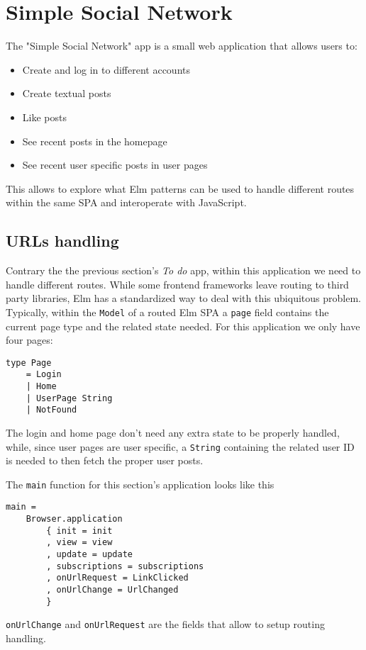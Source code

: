 \section{Simple Social Network}
The "Simple Social Network" app is a small web application that allows users to:
\begin{itemize}
    \item Create and log in to different accounts
    \item Create textual posts
    \item Like posts
    \item See recent posts in the homepage
    \item See recent user specific posts in user pages
\end{itemize}
This allows to explore what Elm patterns can be used to handle different routes within the same SPA and interoperate with JavaScript.

\subsection{URLs handling}
Contrary the the previous section's \textit{To do} app, within this application we need to handle different routes. While some frontend frameworks leave routing to third party libraries, Elm has a standardized way to deal with this ubiquitous problem.\\

Typically, within the \texttt{Model} of a routed Elm SPA a \texttt{page} field contains the current page type and the related state needed. For this application we only have four pages:
\begin{verbatim}
type Page
    = Login
    | Home
    | UserPage String
    | NotFound
\end{verbatim}
The login and home page don't need any extra state to be properly handled, while, since user pages are user specific, a \texttt{String} containing the related user ID is needed to then fetch the proper user posts.

The \texttt{main} function for this section's application looks like this

\begin{verbatim}
main =
    Browser.application
        { init = init
        , view = view
        , update = update
        , subscriptions = subscriptions
        , onUrlRequest = LinkClicked
        , onUrlChange = UrlChanged
        }
\end{verbatim}

\texttt{onUrlChange} and \texttt{onUrlRequest} are the fields that allow to setup routing handling.\\

